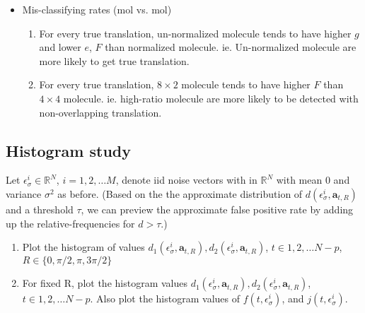 \documentclass[11pt]{article}
\newcommand{\ba}{\boldsymbol{a}}
\begin{document}
\begin{enumerate}
\begin{itemize}
            \item Mis-classifying rates (mol vs. mol)
            \begin{enumerate}
                \item For every true translation, un-normalized molecule tends to have higher $g$ and lower $e$, $F$ than normalized molecule. ie. Un-normalized molecule are more likely to get true translation.
                \item For every true translation, $8\times 2$ molecule tends to have higher $F$ than $4\times 4$ molecule. ie. high-ratio molecule are more likely to be detected with non-overlapping translation.
            \end{enumerate}
        \end{itemize}
        
    \end{enumerate}

\subsection{Histogram study}
Let $\epsilon_{\sigma}^{i}  \in \mathbb{R}^{N}$, $i=1,2,\ldots M$, denote iid noise vectors with in $\mathbb{R}^{N}$ with mean $0$ and variance $\sigma^2$ as before. (Based on the the approximate distribution of $d(\epsilon_{\sigma}^i, \ba_{t,R})$ and a threshold $\tau$, we can preview the approximate false positive rate by adding up the relative-frequencies for $d>\tau$.)

\begin{enumerate}
\item Plot the histogram of values $d_{1}(\epsilon_{\sigma}^i, \ba_{t,R}), d_{2}(\epsilon_{\sigma}^i, \ba_{t,R})$, $t\in 1,2,\ldots N-p$, $R \in \{ 0,\pi/2, \pi, 3\pi/2 \}$ 
\item For fixed R, plot the histogram values $d_{1}(\epsilon_{\sigma}^i, \ba_{t,R}), d_{2}(\epsilon_{\sigma}^i, \ba_{t,R})$, $t\in 1,2,\ldots N-p$. Also plot the histogram values of $f(t,\epsilon_{\sigma}^i)$, and $j(t,\epsilon_{\sigma}^i)$.
\end{enumerate}
\end{document}
